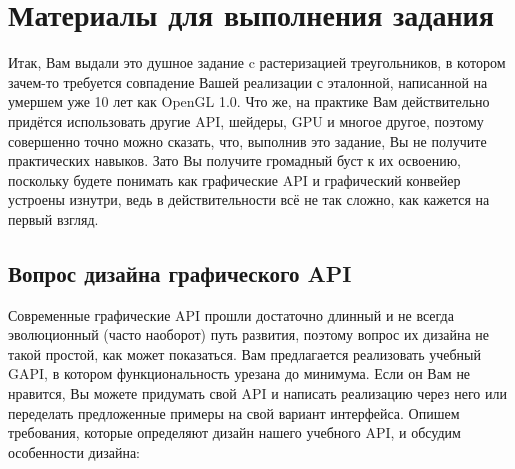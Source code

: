 \documentclass[12pt,subf,href,colorlinks=true]{article}
\begin{document}
\section{Материалы для выполнения задания}\label{materials}

Итак, Вам выдали это душное задание c растеризацией треугольников, в котором зачем-то требуется совпадение Вашей реализации с эталонной, написанной на умершем уже 10 лет как OpenGL 1.0. Что же, на практике Вам действительно придётся использовать другие API, шейдеры, GPU и многое другое, поэтому совершенно точно можно сказать, что, выполнив это задание, Вы не получите практических навыков. Зато Вы получите громадный буст к их освоению, поскольку будете понимать как графические API и графический конвейер устроены изнутри, ведь в действительности всё не так сложно, как кажется на первый взгляд.

\subsection{Вопрос дизайна графического API}

Современные графические API прошли достаточно длинный и не всегда эволюционный (часто наоборот) путь развития, поэтому вопрос их дизайна не такой простой, как может показаться. Вам предлагается реализовать учебный GAPI, в котором функциональность урезана до минимума. Если он Вам не нравится, Вы можете придумать свой API и написать реализацию через него или переделать предложенные примеры на свой вариант интерфейса. Опишем требования, которые определяют дизайн нашего учебного API, и обсудим особенности дизайна:
\end{document}

